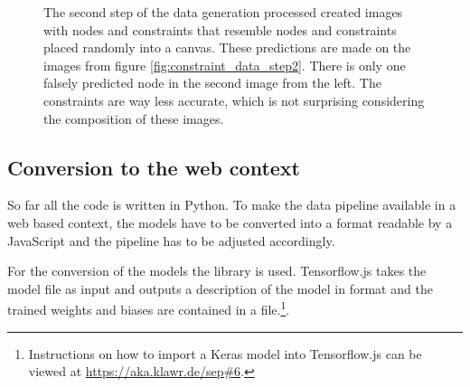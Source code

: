 \begin{figure}
\begin{subfigure}[b]{0.19\textwidth}
    \end{subfigure}
    \begin{subfigure}[b]{0.19\textwidth}
    \end{subfigure}
    \caption[Predictions of the first prototype on the generated data]{The second step of the data generation processed created images with nodes and constraints that resemble nodes and constraints placed randomly into a canvas. These predictions are made on the images from figure \ref{fig:constraint_data_step2}. There is only one falsely predicted node in the second image from the left. The constraints are way less accurate, which is not surprising considering the composition of these images.}
\end{figure}

\subsection{Conversion to the web context}

So far all the code is written in Python.
To make the data pipeline available in a web based context, the models have to be converted into a format readable by a JavaScript and the pipeline has to be adjusted accordingly.

For the conversion of the models the library  %
is used.
Tensorflow.js takes the model file as input and outputs a description of the model in  format and the trained weights and biases are contained in a  file.\footnote{Instructions on how to import a Keras model into Tensorflow.js can be viewed at \url{https://aka.klawr.de/sep\#6}.}. %

